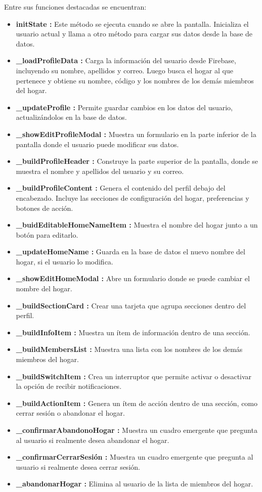Entre sus funciones destacadas se encuentran:

\begin{itemize}
    \item \textbf{initState :} Este método se ejecuta cuando se abre la pantalla. Inicializa el usuario actual y llama a otro método para cargar sus datos desde la base de datos.
    \item \textbf{\_loadProfileData :} Carga la información del usuario desde Firebase, incluyendo su nombre, apellidos y correo. Luego busca el hogar al que pertenece y obtiene su nombre, código y los nombres de los demás miembros del hogar.
    \item \textbf{\_updateProfile :} Permite guardar cambios en los datos del usuario, actualizándolos en la base de datos.  
    \item \textbf{\_showEditProfileModal :} Muestra un formulario en la parte inferior de la pantalla donde el usuario puede modificar sus datos.
    \item \textbf{\_buildProfileHeader :} Construye la parte superior de la pantalla, donde se muestra el nombre y apellidos del usuario y su correo.
    \item \textbf{\_buildProfileContent :} Genera el contenido del perfil debajo del encabezado. Incluye las secciones de configuración del hogar, preferencias y botones de acción.
    \item \textbf{\_buidEditableHomeNameItem :} Muestra el nombre del hogar junto a un botón para editarlo.
    \item \textbf{\_updateHomeName :} Guarda en la base de datos el nuevo nombre del hogar, si el usuario lo modifica.
    \item \textbf{\_showEditHomeModal :} Abre un formulario donde se puede cambiar el nombre del hogar.
    \item \textbf{\_buildSectionCard :} Crear una tarjeta que agrupa secciones dentro del perfil.
    \item \textbf{\_buildInfoItem :} Muestra un ítem de información dentro de una sección.
    \item \textbf{\_buildMembersList :} Muestra una lista con los nombres de los demás miembros del hogar.
    \item \textbf{\_buildSwitchItem :} Crea un interruptor que permite activar o desactivar la opción de recibir notificaciones.
    \item \textbf{\_buildActionItem :} Genera un ítem de acción dentro de una sección, como cerrar sesión o abandonar el hogar.
    \item \textbf{\_confirmarAbandonoHogar :} Muestra un cuadro emergente que pregunta al usuario si realmente desea abandonar el hogar.
    \item \textbf{\_confirmarCerrarSesión :} Muestra un cuadro emergente que pregunta al usuario si realmente desea cerrar sesión.
    \item \textbf{\_abandonarHogar :} Elimina al usuario de la lista de miembros del hogar.
\end{itemize}

